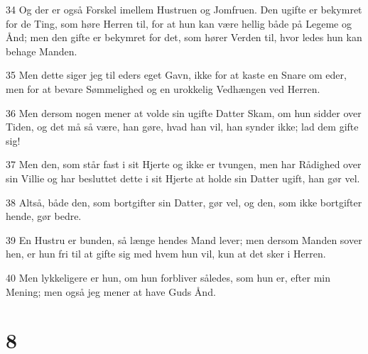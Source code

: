 \par 34 Og der er også Forskel imellem Hustruen og Jomfruen. Den ugifte er bekymret for de Ting, som høre Herren til, for at hun kan være hellig både på Legeme og Ånd; men den gifte er bekymret for det, som hører Verden til, hvor ledes hun kan behage Manden.
\par 35 Men dette siger jeg til eders eget Gavn, ikke for at kaste en Snare om eder, men for at bevare Sømmelighed og en urokkelig Vedhængen ved Herren.
\par 36 Men dersom nogen mener at volde sin ugifte Datter Skam, om hun sidder over Tiden, og det må så være, han gøre, hvad han vil, han synder ikke; lad dem gifte sig!
\par 37 Men den, som står fast i sit Hjerte og ikke er tvungen, men har Rådighed over sin Villie og har besluttet dette i sit Hjerte at holde sin Datter ugift, han gør vel.
\par 38 Altså, både den, som bortgifter sin Datter, gør vel, og den, som ikke bortgifter hende, gør bedre.
\par 39 En Hustru er bunden, så længe hendes Mand lever; men dersom Manden sover hen, er hun fri til at gifte sig med hvem hun vil, kun at det sker i Herren.
\par 40 Men lykkeligere er hun, om hun forbliver således, som hun er, efter min Mening; men også jeg mener at have Guds Ånd.

\chapter{8}

